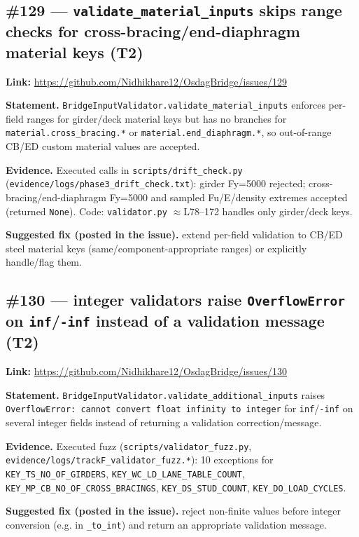 \subsection{\#129 --- \texttt{validate\_material\_inputs} skips range checks for cross-bracing/end-diaphragm material keys (T2)}
\textbf{Link:} \url{https://github.com/Nidhikhare12/OsdagBridge/issues/129}

\textbf{Statement.} \texttt{BridgeInputValidator.validate\_material\_inputs} enforces per-field ranges for girder/deck material keys but has no branches for \texttt{material.cross\_bracing.*} or \texttt{material.end\_diaphragm.*}, so out-of-range CB/ED custom material values are accepted.

\textbf{Evidence.} Executed calls in \texttt{scripts/drift\_check.py} (\texttt{evidence/logs/phase3\_drift\_check.txt}): girder Fy=5000 rejected; cross-bracing/end-diaphragm Fy=5000 and sampled Fu/E/density extremes accepted (returned \texttt{None}). Code: \texttt{validator.py} $\approx$L78--172 handles only girder/deck keys.

\textbf{Suggested fix (posted in the issue).} extend per-field validation to CB/ED steel material keys (same/component-appropriate ranges) or explicitly handle/flag them.

\subsection{\#130 --- integer validators raise \texttt{OverflowError} on \texttt{inf}/\texttt{-inf} instead of a validation message (T2)}
\textbf{Link:} \url{https://github.com/Nidhikhare12/OsdagBridge/issues/130}

\textbf{Statement.} \texttt{BridgeInputValidator.validate\_additional\_inputs} raises \texttt{OverflowError: cannot convert float infinity to integer} for \texttt{inf}/\texttt{-inf} on several integer fields instead of returning a validation correction/message.

\textbf{Evidence.} Executed fuzz (\texttt{scripts/validator\_fuzz.py}, \texttt{evidence/logs/trackF\_validator\_fuzz.*}): 10 exceptions for \texttt{KEY\_TS\_NO\_OF\_GIRDERS}, \texttt{KEY\_WC\_LD\_LANE\_TABLE\_COUNT}, \texttt{KEY\_MP\_CB\_NO\_OF\_CROSS\_BRACINGS}, \texttt{KEY\_DS\_STUD\_COUNT}, \texttt{KEY\_DO\_LOAD\_CYCLES}.

\textbf{Suggested fix (posted in the issue).} reject non-finite values before integer conversion (e.g. in \texttt{\_to\_int}) and return an appropriate validation message.

